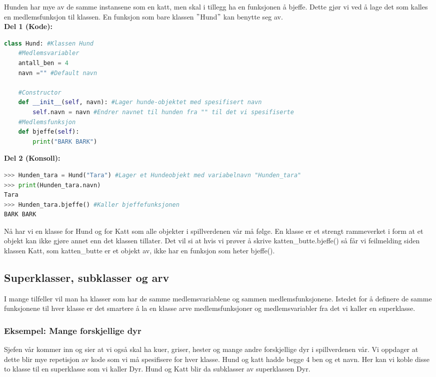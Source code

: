 Hunden har mye av de samme instansene som en katt, men skal i tillegg ha en funksjonen å bjeffe. Dette gjør vi ved å lage det som kalles en medlemsfunksjon til klassen. En funksjon som bare klassen $"$Hund$"$ kan benytte seg av.\\[0.5cm]
\textbf{Del 1 (Kode):}
\begin{lstlisting}[language=python]
class Hund: #Klassen Hund
    #Medlemsvariabler
    antall_ben = 4 
    navn ="" #Default navn
    
    #Constructor
    def __init__(self, navn): #Lager hunde-objektet med spesifisert navn
        self.navn = navn #Endrer navnet til hunden fra "" til det vi spesifiserte
    #Medlemsfunksjon
    def bjeffe(self): 
        print("BARK BARK")
\end{lstlisting}
\textbf{Del 2 (Konsoll):}
\begin{lstlisting}[language=python]
>>> Hunden_tara = Hund("Tara") #Lager et Hundeobjekt med variabelnavn "Hunden_tara"
>>> print(Hunden_tara.navn) 
Tara
>>> Hunden_tara.bjeffe() #Kaller bjeffefunksjonen
BARK BARK
\end{lstlisting}

Nå har vi en klasse for Hund og for Katt som alle objekter i spillverdenen vår må følge. En klasse er et strengt rammeverket i form at et objekt kan ikke gjøre annet enn det klassen tillater. Det vil si at hvis vi prøver å skrive katten\_butte.bjeffe() så får vi feilmelding siden klassen Katt, som katten\_butte er et objekt av, ikke har en funksjon som heter bjeffe(). 


\subsection{Superklasser, subklasser og arv}
I mange tilfeller vil man ha klasser som har de samme medlemsvariablene og sammen medlemsfunksjonene. Istedet for å definere de samme funksjonene til hver klasse er det smartere å la en klasse arve medlemsfunksjoner og medlemsvariabler fra det vi kaller en superklasse. 

\subsubsection{Eksempel: Mange forskjellige dyr}
Sjefen vår kommer inn og sier at vi også skal ha kuer, griser, hester og mange andre forskjellige dyr i spillverdenen vår. Vi oppdager at dette blir mye repetisjon av kode som vi må spesifisere for hver klasse. Hund og katt hadde begge 4 ben og et navn. Her kan vi koble disse to klasse til en superklasse som vi kaller Dyr. Hund og Katt blir da subklasser av superklassen Dyr.

